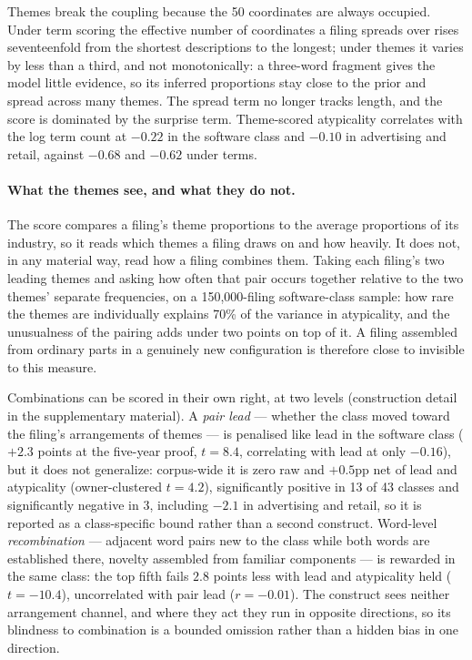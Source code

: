 Themes break the coupling because the 50 coordinates are always occupied.
Under term scoring the effective number of coordinates a filing spreads over
rises seventeenfold from the shortest descriptions to the longest; under
themes it varies by less than a third, and not monotonically: a three-word
fragment gives the model little evidence, so its inferred proportions stay
close to the prior and spread across many themes. The spread term no longer
tracks length, and the score is dominated by the surprise term.
Theme-scored atypicality correlates with the log term count at $-0.22$ in
the software class and $-0.10$ in advertising and retail, against $-0.68$
and $-0.62$ under terms.

\paragraph{What the themes see, and what they do not.} The score compares a
filing's theme proportions to the average proportions of its industry, so it
reads which themes a filing draws on and how heavily. It does not, in any
material way, read how a filing combines them. Taking each filing's two
leading themes and asking how often that pair occurs together relative to the
two themes' separate frequencies, on a 150{,}000-filing software-class
sample: how rare the themes are individually explains
70\% of the variance in atypicality, and the unusualness of the pairing adds
under two points on top of it. A filing assembled from ordinary parts in a
genuinely new configuration is therefore close to invisible to this measure.

Combinations can be scored in their own right, at two levels
(construction detail in the supplementary material). A \emph{pair lead}
--- whether the class moved toward the filing's arrangements of themes
--- is penalised like lead in the software class ($+2.3$ points at the
five-year proof, $t = 8.4$, correlating with lead at only $-0.16$), but
it does not generalize: corpus-wide it is zero raw and $+0.5$pp net of
lead and atypicality (owner-clustered $t = 4.2$), significantly positive
in 13 of 43 classes and significantly negative in 3, including $-2.1$ in
advertising and retail, so it is reported as a class-specific bound
rather than a second construct. Word-level \emph{recombination} ---
adjacent word pairs new to the class while both words are established
there, novelty assembled from familiar components
\citep{Fleming2001, Uzzi2013} --- is rewarded in the same class: the top
fifth fails $2.8$ points less with lead and atypicality held
($t = -10.4$), uncorrelated with pair lead ($r = -0.01$). The construct
sees neither arrangement channel, and where they act they run in
opposite directions, so its blindness to combination is a bounded
omission rather than a hidden bias in one direction.

